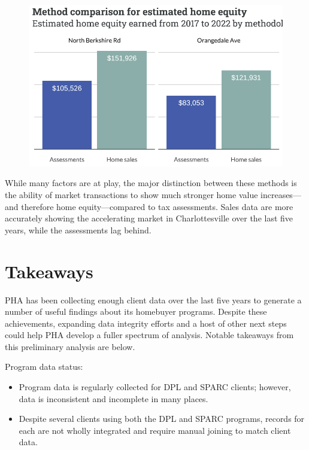 \documentclass[
  letterpaper,
  DIV=11,
  numbers=noendperiod]{scrartcl}
\providecommand{\tightlist}{%
  \setlength{\itemsep}{0pt}\setlength{\parskip}{0pt}}\usepackage{longtable,booktabs,array}
\begin{document}
\begin{figure}[H]

{\centering \includegraphics{piedmont_files/figure-pdf/comp-4-1.pdf}

}

\end{figure}

While many factors are at play, the major distinction between these
methods is the ability of market transactions to show much stronger home
value increases---and therefore home equity---compared to tax
assessments. Sales data are more accurately showing the accelerating
market in Charlottesville over the last five years, while the
assessments lag behind.

\hypertarget{takeaways}{%
\section{Takeaways}\label{takeaways}}

PHA has been collecting enough client data over the last five years to
generate a number of useful findings about its homebuyer programs.
Despite these achievements, expanding data integrity efforts and a host
of other next steps could help PHA develop a fuller spectrum of
analysis. Notable takeaways from this preliminary analysis are below.

Program data status:

\begin{itemize}
\tightlist
\item
  Program data is regularly collected for DPL and SPARC clients;
  however, data is inconsistent and incomplete in many places.
\item
  Despite several clients using both the DPL and SPARC programs, records
  for each are not wholly integrated and require manual joining to match
  client data.
\end{itemize}
\end{document}
